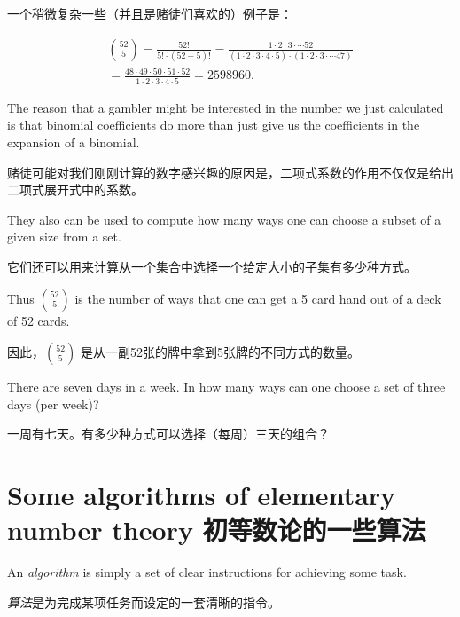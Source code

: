 一个稍微复杂一些（并且是赌徒们喜欢的）例子是：

\begin{gather*} 
\binom{52}{5} = \frac{52!}{5! \cdot (52-5)!} 
 = \frac{1\cdot 2\cdot 3\cdot \cdots 52}{(1\cdot 2\cdot 3 \cdot 4 \cdot 5) \cdot (1\cdot 2 \cdot 3\cdot \cdots 47)}\\
 = \frac{48 \cdot 49 \cdot 50 \cdot 51 \cdot 52}{1\cdot 2\cdot 3 \cdot 4 \cdot 5} = 2598960.
\end{gather*}

The reason that a gambler might be interested in the number we just calculated
is that binomial coefficients do more than just give us the coefficients in the
expansion of a binomial.

赌徒可能对我们刚刚计算的数字感兴趣的原因是，二项式系数的作用不仅仅是给出二项式展开式中的系数。

They also can be used to compute how many ways one
can choose a subset of a given size from a set.

它们还可以用来计算从一个集合中选择一个给定大小的子集有多少种方式。

Thus $\binom{52}{5}$ is the
number of ways that one can get a 5 card hand out of a deck of 52 cards.

因此，$\binom{52}{5}$ 是从一副52张的牌中拿到5张牌的不同方式的数量。

\begin{exer}
There are seven days in a week.  In how many ways can one choose a set
of three days (per week)?
\end{exer}

\begin{exer}
一周有七天。有多少种方式可以选择（每周）三天的组合？
\end{exer}

\newpage




\newpage

\section[Some algorithms]{Some algorithms of elementary number theory 初等数论的一些算法}
\label{sec:alg}

An \emph{algorithm} is simply a set of clear 
instructions for achieving
some task.

\emph{算法}是为完成某项任务而设定的一套清晰的指令。

